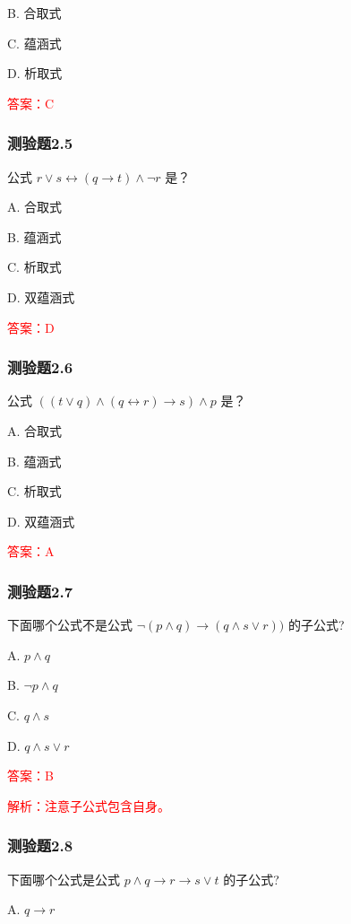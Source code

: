 \documentclass[UTF8, heading=true]{ctexart}
\begin{document}
B. 合取式

C. 蕴涵式

D. 析取式

\textcolor{red}{答案：C}

\subsubsection{测验题2.5}

公式 $r \vee s \leftrightarrow(q \rightarrow t) \wedge \neg r$ 是？

A. 合取式

B. 蕴涵式

C. 析取式

D. 双蕴涵式

\textcolor{red}{答案：D}

\subsubsection{测验题2.6}

公式 $((t \vee q) \wedge(q \leftrightarrow r) \rightarrow s) \wedge p$ 是？

A. 合取式

B. 蕴涵式

C. 析取式

D. 双蕴涵式

\textcolor{red}{答案：A}

\subsubsection{测验题2.7}

下面哪个公式不是公式 $\neg(p \wedge q) \rightarrow(q \wedge s \vee r))$ 的子公式? $\qquad$

A. $
p \wedge q
$

B. $
\neg p \wedge q
$

C. $
q \wedge s
$

D. $
q \wedge s \vee r
$

\textcolor{red}{答案：B}

\textcolor{red}{解析：注意子公式包含自身。}

\subsubsection{测验题2.8}

下面哪个公式是公式 $p \wedge q \rightarrow r \rightarrow s \vee t$ 的子公式?

A. $q \rightarrow r$
\end{document}
